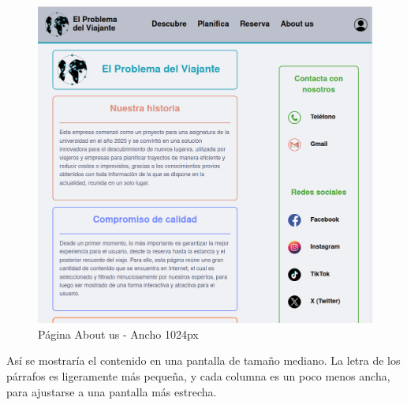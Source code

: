 \documentclass[11pt, a4paper]{book}
\begin{document}
	\begin{figure} [H]
		\centering
		\includegraphics[height=0.4\textheight]{CSS/3-3 1024.png}
		\caption{Página About us - Ancho 1024px}
	\end{figure}

	Así se mostraría el contenido en una pantalla de tamaño mediano. La letra de los párrafos es ligeramente más pequeña, y cada columna es un poco menos ancha, para ajustarse a una pantalla más estrecha.
\end{document}
